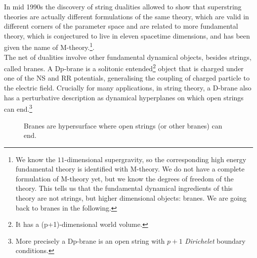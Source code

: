 \documentclass[draft]{phd}
\begin{document}
In mid 1990s the discovery of string dualities allowed to show that superstring theories are actually different formulations of the same theory, which are valid
in different corners of the parameter space and are related to more fundamental theory, which is conjectured to live in eleven spacetime dimensions, and has been given the name of M-theory.\footnote{%
			We know the $11$-dimensional supergravity, so the corresponding high energy fundamental theory is identified with M-theory.
			We do not have a complete formulation of M-theory yet, but we know the degrees of freedom of the theory.
			This tells us that the fundamental dynamical ingredients of this theory are not strings, but higher dimensional objects: branes.
			We are going back to branes in the following.}.	\\
The net of dualities involve other fundamental dynamical objects, besides strings, called branes.  A Dp-brane is a  solitonic  entended\footnote{It has a (p+1)-dimensional world volume.} object  that is charged under one 
of  the NS and RR potentials, generalising the coupling of charged particle to the electric field. Crucially for many applications, in string theory, a 
 D-brane also has a  perturbative description as dynamical hyperplanes on which  open strings can end.\footnote{More precisely a Dp-brane is an open string with  $p+1$ \emph{Dirichelet} boundary conditions.}
					\begin{figure}[h!]
						\centering
						
						\caption{Branes are hypersurface where open strings (or other branes) can end.}
						\label{branefig}
					\end{figure}
			
\end{document}
